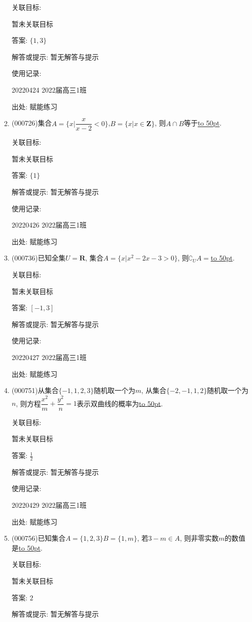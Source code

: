 \documentclass[10pt,a4paper]{article}
\newcommand{\blank}[1]{\underline{\hbox to #1pt{}}}
\begin{document}
\begin{enumerate}[1.]
关联目标:

暂未关联目标

答案: $\{1,3\}$

解答或提示: 暂无解答与提示

使用记录:

20220424	2022届高三1班	


出处: 赋能练习
\item { (000726)}集合$A=\{x|\dfrac x{x-2}<0\}$,$B=\{x|x\in \mathbf{Z}\}$, 则$A\cap B$等于\blank{50}.


关联目标:

暂未关联目标

答案: $\{1\}$

解答或提示: 暂无解答与提示

使用记录:

20220426	2022届高三1班	


出处: 赋能练习
\item { (000736)}已知全集$U=\mathbf{R}$, 集合$A=\{x|x^2-2x-3>0\}$, 则$\complement_U A=$\blank{50}.


关联目标:

暂未关联目标

答案: $[-1,3]$

解答或提示: 暂无解答与提示

使用记录:

20220427	2022届高三1班	


出处: 赋能练习
\item { (000751)}从集合$\{-1,1,2,3\}$随机取一个为$m$, 从集合$\{-2,-1,1,2\}$随机取一个为$n$, 则方程$\dfrac{x^2}m+\dfrac{y^2}n=1$表示双曲线的概率为\blank{50}.


关联目标:

暂未关联目标

答案: $\frac 12$

解答或提示: 暂无解答与提示

使用记录:

20220429	2022届高三1班	


出处: 赋能练习
\item { (000756)}已知集合$A=\{1,2,3\}B=\{1,m\}$, 若$3-m\in A$, 则非零实数$m$的数值是\blank{50}.


关联目标:

暂未关联目标

答案: $2$

解答或提示: 暂无解答与提示


\end{enumerate}
\end{document}
